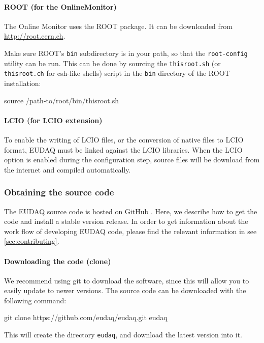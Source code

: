 \paragraph{ROOT (for the OnlineMonitor)}
\label{sec:Root}
The Online Monitor uses the ROOT package.
It can be downloaded from \url{http://root.cern.ch}.

Make sure ROOT's \texttt{bin} subdirectory is in your path, so that the \texttt{root-config} utility can be run.
This can be done by sourcing the \texttt{thisroot.sh} (or \texttt{thisroot.ch} for csh-like shells)
script in the \texttt{bin} directory of the ROOT installation:
\begin{listing}[mybash]
source /path-to/root/bin/thisroot.sh
\end{listing}

\paragraph{LCIO (for LCIO extension)}
\label{sec:LCIO}
To enable the writing of \gls{LCIO} files, or the conversion of native files to \gls{LCIO} format,
EUDAQ must be linked against the \gls{LCIO} libraries.
When the LCIO option is enabled during the configuration step, source files will be download from the internet and compiled automatically.

\subsubsection{Obtaining the source code}
\label{sec:downloadingEUDAQ}

The EUDAQ source code is hosted on GitHub \cite{githubEUDAQ}. 
Here, we describe how to get the code and install a stable version release. 
In order to get information about the work flow of developing EUDAQ code, please find the relevant information in see \autoref{sec:contributing}.

\paragraph{Downloading the code (clone)}
We recommend using git to download the software,
since this will allow you to easily update to newer versions.
The source code can be downloaded with the following command:
\begin{listing}[mybash]
git clone https://github.com/eudaq/eudaq.git eudaq
\end{listing}
This will create the directory \texttt{eudaq}, and download the latest
version into it. 


